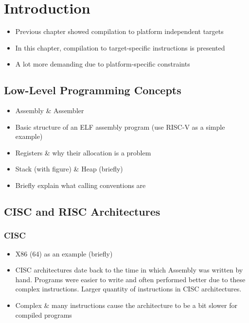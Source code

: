 \section{Introduction}

\begin{itemize}
	\item Previous chapter showed compilation to platform independent targets
	\item In this chapter, compilation to target-specific instructions is presented
	\item A lot more demanding due to platform-specific constraints
\end{itemize}

\subsection{Low-Level Programming Concepts}

\begin{itemize}
	\item Assembly \& Assembler
	\item Basic structure of an ELF assembly program (use RISC-V as a simple example)
	\item Registers \& why their allocation is a problem
	\item Stack (with figure) \& Heap (briefly)
	\item Briefly explain what calling conventions are
\end{itemize}

\subsection{CISC and RISC Architectures}

\subsubsection{CISC}
\begin{itemize}
	\item X86 (64) as an example (briefly)
	\item CISC architectures date back to the time in which Assembly was written by hand.
	      Programs were easier to write and often performed better due to these complex instructions.
	      Larger quantity of instructions in CISC architectures.
	\item Complex & many instructions cause the architecture to be a bit slower for compiled programs
\end{itemize}

